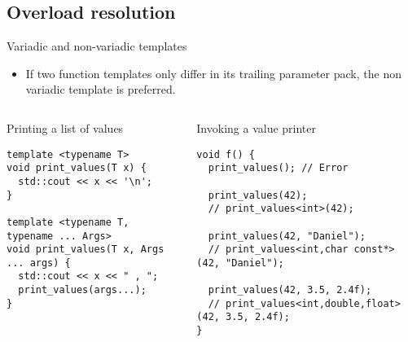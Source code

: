 \subsection{Overload resolution}

\begin{frame}[t,fragile]{Variadic and non-variadic templates}
  \begin{itemize}
    \item If two function templates only differ in its trailing
          parameter pack, the non variadic template is preferred.
  \end{itemize}

\begin{columns}[T]

\begin{block}{Printing a list of values}
\begin{lstlisting}
template <typename T>
void print_values(T x) {
  std::cout << x << '\n';
}

template <typename T, typename ... Args>
void print_values(T x, Args ... args) {
  std::cout << x << " , ";
  print_values(args...);
}
\end{lstlisting}
\end{block}

\begin{block}{Invoking a value printer}
\begin{lstlisting}
void f() {
  print_values(); // Error

  print_values(42);
  // print_values<int>(42);

  print_values(42, "Daniel");
  // print_values<int,char const*>(42, "Daniel");

  print_values(42, 3.5, 2.4f);
  // print_values<int,double,float>(42, 3.5, 2.4f);
}
\end{lstlisting}
\end{block}

\end{columns}
\end{frame}

